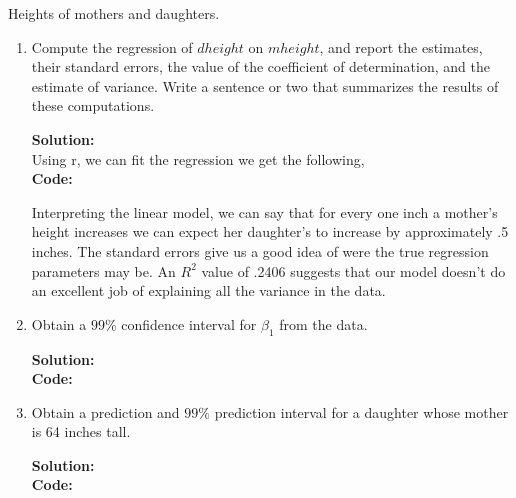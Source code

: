 \documentclass[12pt]{article}
\makeatletter
\theoremstyle{homework}
\newenvironment{exercise}[1]
{\def\@currentlabel{#1}\exercisecore}
{\endexercisecore}
\newcommand{\localhead}[1]{\par\smallskip\noindent\textbf{#1}\nobreak\\}%
\newcommand\solution{\localhead{Solution:}}
\makeatother
\begin{document}
\begin{exercise}{2.13} Heights of mothers and daughters.
  \begin{enumerate}
    \item Compute the regression of $dheight$ on $mheight$, and report the estimates,
    their standard errors, the value of the coefficient of determination, and the estimate of 
    variance. Write a sentence or two that summarizes the results of these computations.\\
    \solution Using r, we can fit the regression we get the following, \\
    \textbf{Code:}
    \begin{center}
    
    \end{center}
    Interpreting the linear model, we can say that for every one inch a mother's height increases
    we can expect her daughter's to increase by approximately .5 inches. The standard errors give us a good
    idea of were the true regression parameters may be. An $R^2$ value of .2406 suggests that our model 
    doesn't do an excellent job of explaining all the variance in the data. 
    \newpage

    \item Obtain a $99\%$ confidence interval for $\beta_1$ from the data.\\
    \solution 
    \textbf{Code:}
    \begin{center}
    
    \end{center}
    \newpage

    \item Obtain a prediction and $99\%$ prediction interval for a daughter 
    whose mother is 64 inches tall.\\
    \solution
    \textbf{Code:}
    \begin{center}
    
    \end{center}
  \end{enumerate}
\end{exercise}
\newpage
\end{document}
